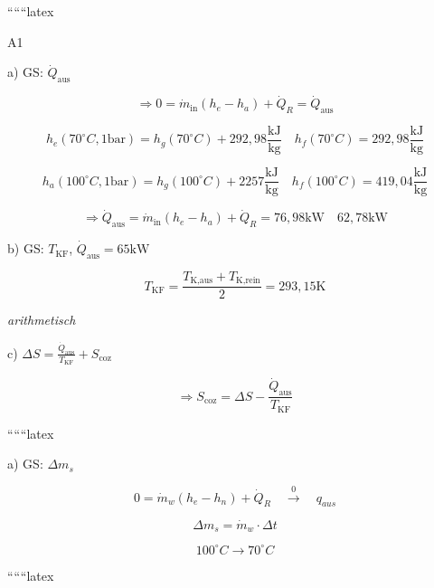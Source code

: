 
``````latex


A1

a) GS: $\dot{Q}_{\text{aus}}$

\[
\Rightarrow 0 = \dot{m}_{\text{in}} (h_e - h_a) + \dot{Q}_R = \dot{Q}_{\text{aus}}
\]

\[
h_e(70^\circ C, 1 \text{bar}) = h_g(70^\circ C) + 292,98 \frac{\text{kJ}}{\text{kg}} \quad h_f(70^\circ C) = 292,98 \frac{\text{kJ}}{\text{kg}}
\]

\[
h_a(100^\circ C, 1 \text{bar}) = h_g(100^\circ C) + 2257 \frac{\text{kJ}}{\text{kg}} \quad h_f(100^\circ C) = 419,04 \frac{\text{kJ}}{\text{kg}}
\]

\[
\Rightarrow \dot{Q}_{\text{aus}} = \dot{m}_{\text{in}} (h_e - h_a) + \dot{Q}_R = 76,98 \text{kW} \quad 62,78 \text{kW}
\]

b) GS: $T_{\text{KF}}$, $\dot{Q}_{\text{aus}} = 65 \text{kW}$

\[
T_{\text{KF}} = \frac{T_{\text{K,aus}} + T_{\text{K,rein}}}{2} = 293,15 \text{K}
\]

\textit{arithmetisch}

c) $\Delta S = \frac{\dot{Q}_{\text{aus}}}{T_{\text{KF}}} + S_{\text{coz}}$

\[
\Rightarrow S_{\text{coz}} = \Delta S - \frac{\dot{Q}_{\text{aus}}}{T_{\text{KF}}}
\]

``````latex


a) GS: $\Delta m_{s}$

\[
0 = \dot{m}_{w} (h_{e} - h_{n}) + \dot{Q}_{R} \quad \overset{0}{\rightarrow} \quad q_{aus}
\]

\[
\Delta m_{s} = \dot{m}_{w} \cdot \Delta t
\]

\[
100^\circ C \rightarrow 70^\circ C
\]

``````latex


